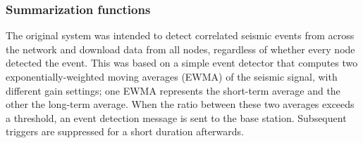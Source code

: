 
\subsubsection{Summarization functions}
\label{lance-sec-casestudy-nuc}

The original system was intended to detect correlated seismic
events from across the network and download data from all nodes,
regardless of whether every node detected the event. This was based
on a simple event detector that computes two exponentially-weighted
moving averages (EWMA) of the seismic signal, with different gain
settings; one EWMA represents the short-term average and the other
the long-term average. When the ratio between these two averages
exceeds a threshold, an event detection message is sent to the base 
station. Subsequent triggers are suppressed for a short duration
afterwards.

